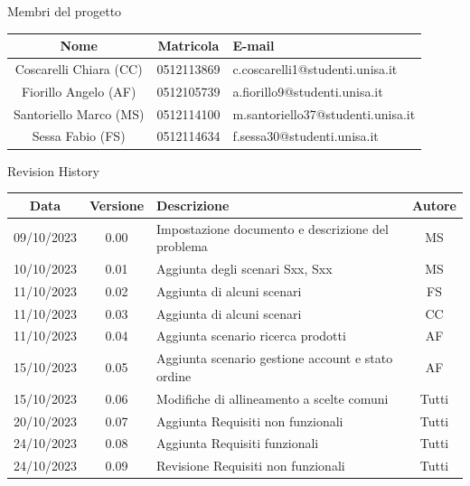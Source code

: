 \documentclass[12pt, a4paper, oneside]{book}
\begin{document}
    \newpage
    \begin{center}
    {\LARGE{Membri del progetto}}
    \end{center}
    \begin{center}
        \begin{tabular}{|c|c|m{8cm}|}
            \hline
            \cellcolor{lightgray} \textbf{Nome} & \cellcolor{lightgray} \textbf{Matricola} & \cellcolor{lightgray} \textbf{E-mail}\\ \hline
            Coscarelli Chiara (CC) & 0512113869 & c.coscarelli1@studenti.unisa.it\\ \hline
            Fiorillo Angelo (AF) & 0512105739 & a.fiorillo9@studenti.unisa.it\\ \hline
            Santoriello Marco (MS) &  0512114100 & m.santoriello37@studenti.unisa.it\\ \hline
            Sessa Fabio (FS) & 0512114634 & f.sessa30@studenti.unisa.it\\ \hline
        \end{tabular}
    \end{center}

    \begin{center}
    {\LARGE{Revision History}}
    \end{center}

    \begin{center}
        \begin{tabular}{|c|c|m{8cm}|c|}
            \hline
            \cellcolor{lightgray} \textbf{Data} & \cellcolor{lightgray} \textbf{Versione} & \cellcolor{lightgray} \textbf{Descrizione} & \cellcolor{lightgray} \textbf{Autore}\\ \hline
            09/10/2023 & 0.00 & Impostazione documento e descrizione del problema & MS\\ \hline
            10/10/2023 & 0.01 & Aggiunta degli scenari Sxx, Sxx & MS\\ \hline
            11/10/2023 & 0.02 & Aggiunta di alcuni scenari & FS\\ \hline
            11/10/2023 & 0.03 & Aggiunta di alcuni scenari & CC\\ \hline
            11/10/2023 & 0.04 & Aggiunta scenario ricerca prodotti & AF\\ \hline
            15/10/2023 & 0.05 & Aggiunta scenario gestione account e stato ordine & AF\\ \hline
            15/10/2023 & 0.06 & Modifiche di allineamento a scelte comuni & Tutti\\ \hline
            20/10/2023 & 0.07 & Aggiunta Requisiti non funzionali & Tutti\\ \hline
            24/10/2023 & 0.08 & Aggiunta Requisiti funzionali & Tutti\\ \hline
            24/10/2023 & 0.09 & Revisione Requisiti non funzionali & Tutti\\ \hline
        \end{tabular}
    \end{center}
\end{document}
